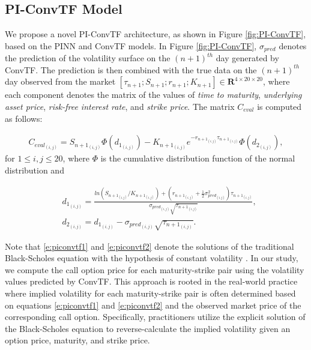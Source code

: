 \documentclass{article}
\begin{document}
\subsection{PI-ConvTF Model}
We propose a novel PI-ConvTF architecture, as shown in Figure \ref{fig:PI-ConvTF}, based on the PINN and ConvTF models. 
In Figure \ref{fig:PI-ConvTF}, $\sigma_{pred}$ denotes the prediction of the volatility surface on the $(n+1)^{th}$ day generated by ConvTF. 
The prediction is then combined with the true data on the $(n+1)^{th}$ day observed from the market $[\tau_{n+1}; S_{n+1}; r_{n+1}; K_{n+1}] \in \textbf{R}^{4 \times 20 \times 20}$, where each component denotes the matrix of the values of \textit{time to maturity}, \textit{underlying asset price}, \textit{risk-free interest rate}, and \textit{strike price}. The matrix $C_{eval}$ is computed as follows:

\begin{equation} 
\begin{split}
    C_{eval_{(i, j)}} = S_{n+1_{(i, j)}}\Phi(d_{1_{(i, j)}}) - K_{n+1_{(i, j)}}e^{-r_{n+1_{(i, j)}}\tau_{n+1_{(i, j)}}}\Phi(d_{2_{(i, j)}}),
\end{split} \label{e:piconvtf1}
\end{equation}
for $1 \leq i,j \leq 20$, where $\Phi$ is the cumulative distribution function of the normal distribution and

\begin{equation} 
\begin{split}
    & d_{1_{(i, j)}} = \frac{ln(S_{n+1_{(i, j)}}/K_{n+1_{(i, j)}}) + (r_{n+1_{(i, j)}} + \frac{1}{2}\sigma_{pred_{(i, j)}}^2)\tau_{n+1_{(i, j)}}}{\sigma_{pred_{(i, j)}}\sqrt{\tau_{n+1_{(i, j)}}}},\\ 
    & d_{2_{(i, j)}} = d_{1_{(i, j)}} - \sigma_{pred_{(i, j)}}\sqrt{\tau_{n+1_{(i, j)}}}.
\end{split} \label{e:piconvtf2}
\end{equation}

Note that \eqref{e:piconvtf1} and \eqref{e:piconvtf2} denote the solutions of the traditional Black-Scholes equation with the hypothesis of constant volatility \citep{black1973the}. 
In our study, we compute the call option price for each maturity-strike pair using the volatility values predicted by ConvTF. This approach is rooted in the real-world practice where implied volatility for each maturity-strike pair is often determined based on equations \eqref{e:piconvtf1} and \eqref{e:piconvtf2} and the observed market price of the corresponding call option. Specifically, practitioners utilize the explicit solution of the Black-Scholes equation to reverse-calculate the implied volatility given an option price, maturity, and strike price.
\end{document}
